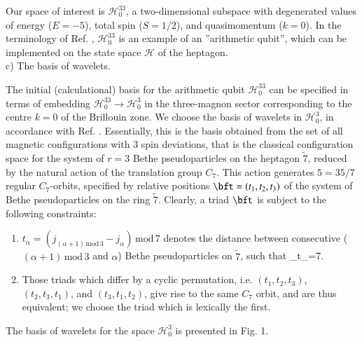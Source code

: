 \documentclass{elsarticle}
\begin{document}
Our space of interest is $\mathcal{H}^{33}_0$, a two-dimensional subspace with degenerated values of energy ($E=-5$), total spin ($S=1/2$), and quasimomentum ($k=0$). In the terminology of Ref. \cite{mblls}, $\mathcal{H}^{33}_0$ is an example of an ''arithmetic qubit'', which can be implemented on the state space $\mathcal{H}$ of the heptagon.\\

c) The basis of wavelets.

The initial (calculational) basis for the arithmetic qubit $\mathcal{H}^{33}_0$ can be specified in terms of embedding  $\mathcal{H}^{33}_0\to  \mathcal{H}^{3}_0$ in the three-magnon sector corresponding to the centre $k=0$ of the Brillouin zone. We choose the basis of wavelets in $\mathcal{H}^{3}_0$, in accordance with Ref. \cite{llwj}. Essentially, this is the basis obtained from the set of all magnetic configurations with 3 spin deviations, that is the classical configuration space for the system of $r=3$ Bethe pseudoparticles on the heptagon $\tilde{7}$, reduced by the natural action of the translation group $C_7$. This action generates $5=35/7$ regular $C_7$-orbits, specified by relative positions $\bft=(t_1,t_2,t_3)$ of the system of Bethe pseudoparticles on the ring $\tilde{7}$. Clearly, a triad $\bft$ is subject to the following constraints:
\begin{enumerate}
\item $t_{\alpha}=(j_{(\alpha+1)\mathrm{\, mod \,}3}-j_{\alpha})\mathrm{\, mod \,}7$ denotes the distance between consecutive \linebreak ($(\alpha+1)\mathrm{\, mod \,}3$ and $\alpha$) Bethe pseudoparticles on $\tilde{7}$, such that
\be
\sum_{\alpha\in{}}t_{\alpha}=7.
\ee
\item Those triads which differ by a cyclic permutation, i.e. $(t_1,t_2,t_3)$, $(t_2,t_3,t_1)$, and $(t_3,t_1,t_2)$, give rise to the same $C_7$ orbit, and are thus equivalent; we choose the triad which is lexically the first.
\end{enumerate}

The basis of wavelets for the space $\mathcal{H}^{3}_0$ is presented in Fig. 1.%
\end{document}
